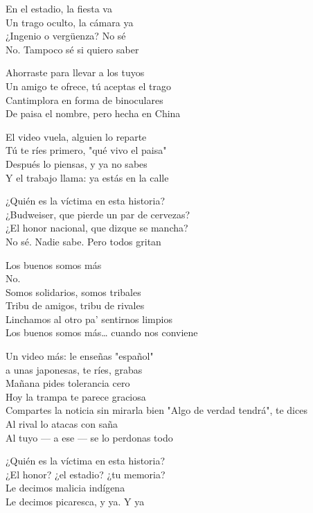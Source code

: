 \begin{lyrics}
En el estadio, la fiesta va\\
Un trago oculto, la cámara ya\\
¿Ingenio o vergüenza? No sé\\
No. Tampoco sé si quiero saber

Ahorraste para llevar a los tuyos\\
Un amigo te ofrece, tú aceptas el trago\\
Cantimplora en forma de binoculares\\
De paisa el nombre, pero hecha en China

El video vuela, alguien lo reparte\\
Tú te ríes primero, "qué vivo el paisa"\\
Después lo piensas, y ya no sabes\\
Y el trabajo llama: ya estás en la calle

¿Quién es la víctima en esta historia?\\
¿Budweiser, que pierde un par de cervezas?\\
¿El honor nacional, que dizque se mancha?\\
No sé. Nadie sabe. Pero todos gritan

Los buenos somos más\\
No.\\
Somos solidarios, somos tribales\\
Tribu de amigos, tribu de rivales\\
Linchamos al otro pa' sentirnos limpios\\
Los buenos somos más… cuando nos conviene

Un video más: le enseñas "español"\\
a unas japonesas, te ríes, grabas\\
Mañana pides tolerancia cero\\
Hoy la trampa te parece graciosa\\
Compartes la noticia sin mirarla bien
"Algo de verdad tendrá", te dices\\
Al rival lo atacas con saña\\
Al tuyo — a ese — se lo perdonas todo

¿Quién es la víctima en esta historia?\\
¿El honor? ¿el estadio? ¿tu memoria?\\
Le decimos malicia indígena\\
Le decimos picaresca, y ya. Y ya


\end{lyrics}

